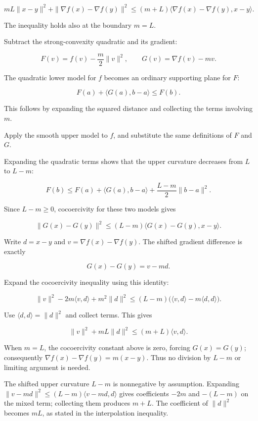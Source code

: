 \documentclass[11pt,a4paper]{article}
\begin{document}
\[mL\|x-y\|^2+\|\nabla f(x)-\nabla f(y)\|^2\le(m+L)\langle\nabla f(x)-\nabla f(y),x-y\rangle.\]

The inequality holds also at the boundary \(m=L\).



Subtract the strong-convexity quadratic and its gradient:

\[F(v)=f(v)-\frac m2\|v\|^2,\qquad G(v)=\nabla f(v)-mv.\]

The quadratic lower model for \(f\) becomes an ordinary supporting plane for \(F\):

\[F(a)+\langle G(a),b-a\rangle\le F(b).\]

This follows by expanding the squared distance and collecting the terms involving \(m\).



Apply the smooth upper model to \(f\), and substitute the same definitions of \(F\) and \(G\).



Expanding the quadratic terms shows that the upper curvature decreases from \(L\) to \(L-m\):

\[F(b)\le F(a)+\langle G(a),b-a\rangle+\frac{L-m}{2}\|b-a\|^2.\]

Since \(L-m\ge0\), cocoercivity for these two models gives

\[\|G(x)-G(y)\|^2\le(L-m)\langle G(x)-G(y),x-y\rangle.\]

Write \(d=x-y\) and \(v=\nabla f(x)-\nabla f(y)\). The shifted gradient difference is exactly

\[G(x)-G(y)=v-md.\]

Expand the cocoercivity inequality using this identity:

\[\|v\|^2-2m\langle v,d\rangle+m^2\|d\|^2\le(L-m)\bigl(\langle v,d\rangle-m\langle d,d\rangle\bigr).\]

Use \(\langle d,d\rangle=\|d\|^2\) and collect terms. This gives

\[\|v\|^2+mL\|d\|^2\le(m+L)\langle v,d\rangle.\]

When \(m=L\), the cocoercivity constant above is zero, forcing \(G(x)=G(y)\); consequently \(\nabla f(x)-\nabla f(y)=m(x-y)\). Thus no division by \(L-m\) or limiting argument is needed.



The shifted upper curvature \(L-m\) is nonnegative by assumption. Expanding \(\|v-md\|^2\le(L-m)\langle v-md,d\rangle\) gives coefficients \(-2m\) and \(-(L-m)\) on the mixed term; collecting them produces \(m+L\). The coefficient of \(\|d\|^2\) becomes \(mL\), as stated in the interpolation inequality.
\end{document}

